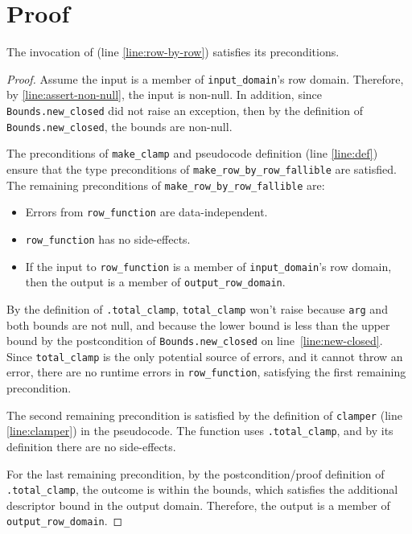 \documentclass{article}
\begin{document}
\section{Proof} 
 
\begin{lemma} 
    The invocation of  (line \ref{line:row-by-row}) satisfies its preconditions. 
\end{lemma} 
 
\begin{proof} 
    Assume the input is a member of \texttt{input\_domain}'s row domain.  
    Therefore, by \ref{line:assert-non-null}, the input is non-null. 
    In addition, since \texttt{Bounds.new\_closed} did not raise an exception, then by the definition of \texttt{Bounds.new\_closed}, the bounds are non-null. 
    
    \label{lemma:row-by-row-precondition} 
    The preconditions of \texttt{make\_clamp} and pseudocode definition (line \ref{line:def}) ensure that the type preconditions of \texttt{make\_row\_by\_row\_fallible} are satisfied.  
    The remaining preconditions of \texttt{make\_row\_by\_row\_fallible} are: 
    \begin{itemize} 
        \item Errors from \texttt{row\_function} are data-independent.
        \item \texttt{row\_function} has no side-effects.
        \item If the input to \texttt{row\_function} is a member of \texttt{input\_domain}'s row domain, then the output is a member of \texttt{output\_row\_domain}. 
    \end{itemize}
    
    \item By the definition of \texttt{.total\_clamp}, 
    \texttt{total\_clamp} won't raise because \texttt{arg} and both bounds are not null,
    and because the lower bound is less than the upper bound by the postcondition of \texttt{Bounds.new\_closed} on line~\ref{line:new-closed}.
    Since \texttt{total\_clamp} is the only potential source of errors, and it cannot throw an error,
    there are no runtime errors in \texttt{row\_function}, satisfying the first remaining precondition.

    The second remaining precondition is satisfied by the definition of \texttt{clamper} (line \ref{line:clamper}) in the pseudocode.
    The function uses \texttt{.total\_clamp}, and by its definition there are no side-effects.
 
    For the last remaining precondition, 
    by the postcondition/proof definition of \texttt{.total\_clamp},
    the outcome is within the bounds, which satisfies the additional descriptor bound in the output domain.
    Therefore, the output is a member of \texttt{output\_row\_domain}. 
\end{proof} 
 
\end{document}
